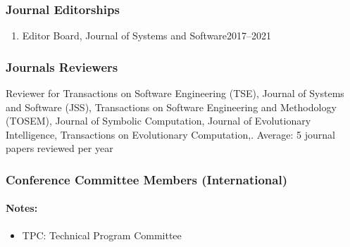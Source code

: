 \documentclass[10pt]{article}
\begin{document}
\subsubsection{Journal Editorships}
\begin{enumerate}
\item Editor Board, Journal of Systems and Software\hfill 2017--2021
\end{enumerate}
\subsubsection{Journals Reviewers}
\begin{description}
\item Reviewer for  Transactions on Software Engineering (TSE), Journal of Systems and Software (JSS), Transactions on Software Engineering and Methodology (TOSEM), Journal of Symbolic Computation, Journal of Evolutionary Intelligence, Transactions on Evolutionary Computation,. Average: 5 journal papers reviewed per year 
\end{description}

\subsubsection{Conference Committee Members (International)}

\paragraph{Notes:}
\begin{itemize}
\item[] TPC: Technical Program Committee
\end{itemize}
\end{document}
